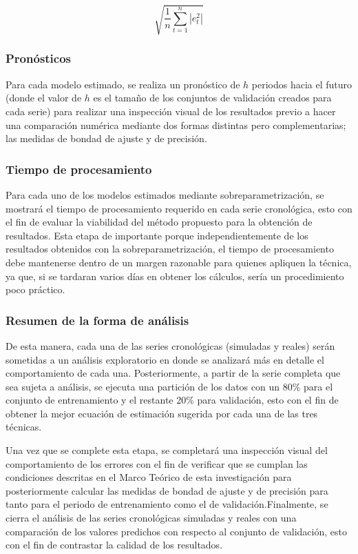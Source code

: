 \documentclass[
]{article}
\begin{document}
\begin{equation}
\label{eqn:RMSE}
\sqrt{\frac{1}{n}\sum_{t=1}^n |e_t^2|}
\end{equation}

\subsubsection{Pronósticos}

Para cada modelo estimado, se realiza un pronóstico de \(h\) periodos
hacia el futuro (donde el valor de \(h\) es el tamaño de los conjuntos
de validación creados para cada serie) para realizar una inspección
visual de los resultados previo a hacer una comparación numérica
mediante dos formas distintas pero complementarias; las medidas de
bondad de ajuste y de precisión.

\subsubsection{Tiempo de procesamiento}

Para cada uno de los modelos estimados mediante sobreparametrización, se
mostrará el tiempo de procesamiento requerido en cada serie cronológica,
esto con el fin de evaluar la viabilidad del método propuesto para la
obtención de resultados. Esta etapa de importante porque
independientemente de los resultados obtenidos con la
sobreparametrización, el tiempo de procesamiento debe mantenerse dentro
de un margen razonable para quienes apliquen la técnica, ya que, si se
tardaran varios días en obtener los cálculos, sería un procedimiento
poco práctico.

\subsubsection{Resumen de la forma de análisis}

De esta manera, cada una de las series cronológicas (simuladas y reales)
serán sometidas a un análisis exploratorio en donde se analizará más en
detalle el comportamiento de cada una. Posteriormente, a partir de la
serie completa que sea sujeta a análisis, se ejecuta una partición de
los datos con un 80\% para el conjunto de entrenamiento y el restante
20\% para validación, esto con el fin de obtener la mejor ecuación de
estimación sugerida por cada una de las tres técnicas.

Una vez que se complete esta etapa, se completará una inspección visual
del comportamiento de los errores con el fin de verificar que se cumplan
las condiciones descritas en el Marco Teórico de esta investigación para
posteriormente calcular las medidas de bondad de ajuste y de precisión
para tanto para el periodo de entrenamiento como el de
validación.Finalmente, se cierra el análisis de las series cronológicas
simuladas y reales con una comparación de los valores predichos con
respecto al conjunto de validación, esto con el fin de contrastar la
calidad de los resultados.
\end{document}
